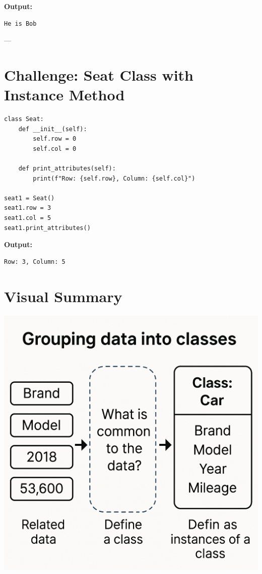 \textbf{Output:}
\begin{verbatim}
He is Bob
\end{verbatim}

---

\section{Challenge: Seat Class with Instance Method}

\begin{verbatim}
class Seat:
    def __init__(self):
        self.row = 0
        self.col = 0

    def print_attributes(self):
        print(f"Row: {self.row}, Column: {self.col}")

seat1 = Seat()
seat1.row = 3
seat1.col = 5
seat1.print_attributes()
\end{verbatim}

\textbf{Output:}
\begin{verbatim}
Row: 3, Column: 5
\end{verbatim}

\section*{Visual Summary}
\begin{center}
\includegraphics[width=\textwidth]{images/oven_abstraction_example.png}
\end{center}


